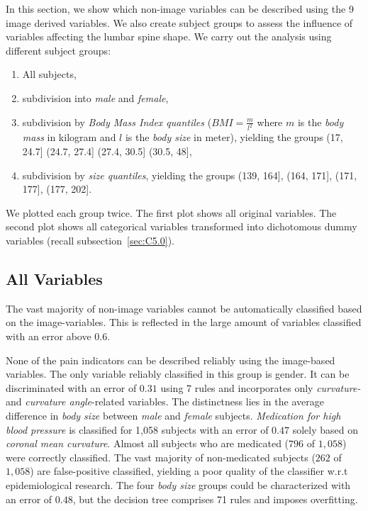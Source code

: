 \documentclass[a4paper,twoside]{style/article}
\begin{document}
\noindent In this section, we show which non-image variables can be described using the 9 image derived variables.
We also create subject groups to assess the influence of variables affecting the lumbar spine shape.
We carry out the analysis using different subject groups:
\begin{enumerate}
	\item All subjects,
	\item subdivision into \emph{male} and \emph{female},
	\item subdivision by \emph{Body Mass Index quantiles} ($BMI = \frac{m}{l^2}$ where $m$ is the \emph{body mass} in kilogram and $l$ is the \emph{body size} in meter), yielding the groups (17, 24.7] (24.7, 27.4] (27.4, 30.5] (30.5, 48],
	\item subdivision by \emph{size quantiles}, yielding the groups (139, 164], (164, 171], (171, 177], (177, 202].
\end{enumerate}
We plotted each group twice.
The first plot shows all original variables.
The second plot shows all categorical variables transformed into dichotomous dummy variables (recall subsection~\ref{sec:C5.0}).

\subsection{All Variables}
The vast majority of non-image variables cannot be automatically classified based on the image-variables.
This is reflected in the large amount of variables classified with an error above $0.6$.

None of the pain indicators can be described reliably using the image-based variables.
The only variable reliably classified in this group is gender. %
%
It can be discriminated with an error of $0.31$ using 7 rules and incorporates only \emph{curvature-} and \emph{curvature angle}-related variables.
The distinctness lies in the average difference in \emph{body size} between \emph{male} and \emph{female} subjects.
\emph{Medication for high blood pressure} is classified for 1,058 subjects with an error of $0.47$ solely based on \emph{coronal mean curvature}.
Almost all subjects who are medicated ($796$ of $1,058$) were correctly classified.
The vast majority of non-medicated subjects ($262$ of $1,058$) are false-positive classified, yielding a poor quality of the classifier w.r.t epidemiological research.
The four \emph{body size} groups could be characterized with an error of $0.48$, but the decision tree comprises 71 rules and imposes overfitting.
\end{document}
